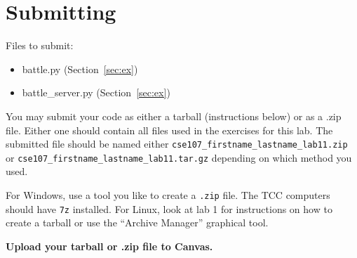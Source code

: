\documentclass[11pt]{cselabheader}
\begin{document}
\pagebreak
\section{Submitting}

Files to submit:
\begin{itemize}
\item battle.py (Section~\ref{sec:ex})
\item battle\_server.py (Section~\ref{sec:ex})
\end{itemize}

You may submit your code as either a tarball (instructions below) or as a .zip
file. Either one should contain all files used in the exercises for this lab.
The submitted file should be named either
\texttt{cse107\_firstname\_lastname\_lab11.zip} or
\texttt{cse107\_firstname\_lastname\_lab11.tar.gz} depending on which method you
used.

For Windows, use a tool you like to create a \texttt{.zip} file. The TCC
computers should have \texttt{7z} installed. For Linux, look at lab 1 for
instructions on how to create a tarball or use the ``Archive Manager'' graphical
tool.

\begin{center}
  \textbf{Upload your tarball or .zip file to Canvas.}
\end{center}
\end{document}
